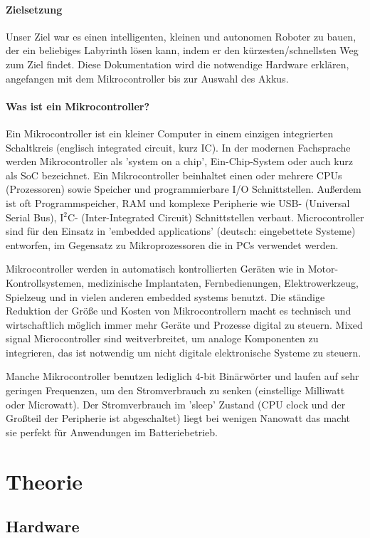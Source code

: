 \documentclass[12pt]{article}
\begin{document}
\paragraph{Zielsetzung} Unser Ziel war es einen intelligenten, kleinen und autonomen Roboter zu bauen, der ein beliebiges Labyrinth lösen kann, indem er den kürzesten/schnellsten Weg zum Ziel findet. Diese Dokumentation wird die notwendige Hardware erklären, angefangen mit dem Mikrocontroller bis zur Auswahl des Akkus. 

\paragraph{Was ist ein Mikrocontroller?} Ein Mikrocontroller ist ein kleiner Computer in einem einzigen integrierten Schaltkreis (englisch integrated circuit, kurz IC). In der modernen Fachsprache werden Mikrocontroller als 'system on a chip', Ein-Chip-System oder auch kurz als SoC bezeichnet. Ein Mikrocontroller beinhaltet einen oder mehrere CPUs (Prozessoren) sowie Speicher und programmierbare I/O Schnittstellen. Außerdem ist oft Programmspeicher, RAM und komplexe Peripherie wie USB- (Universal Serial Bus), I$^2$C- (Inter-Integrated Circuit) Schnittstellen verbaut. Microcontroller sind für den Einsatz in 'embedded applications' (deutsch: eingebettete Systeme) entworfen, im Gegensatz zu Mikroprozessoren die in PCs verwendet werden.

Mikrocontroller werden in automatisch kontrollierten Geräten wie in Motor\hyp Kontrollsystemen, medizinische Implantaten, Fernbedienungen, Elektrowerkzeug, Spielzeug und in vielen anderen embedded systems benutzt. Die ständige Reduktion der Größe und Kosten von Mikrocontrollern macht es technisch und wirtschaftlich möglich immer mehr Geräte und Prozesse digital zu steuern. Mixed signal Microcontroller sind weitverbreitet, um analoge Komponenten zu integrieren, das ist notwendig um nicht digitale elektronische Systeme zu steuern.

Manche Mikrocontroller benutzen lediglich 4-bit Binärwörter und laufen auf sehr geringen Frequenzen, um den Stromverbrauch zu senken (einstellige Milliwatt oder Microwatt). Der Stromverbrauch im 'sleep' Zustand (CPU clock und der Großteil der Peripherie ist abgeschaltet) liegt bei wenigen Nanowatt das macht sie perfekt für Anwendungen im Batteriebetrieb.
\section{Theorie}
\subsection{Hardware}
\end{document}
